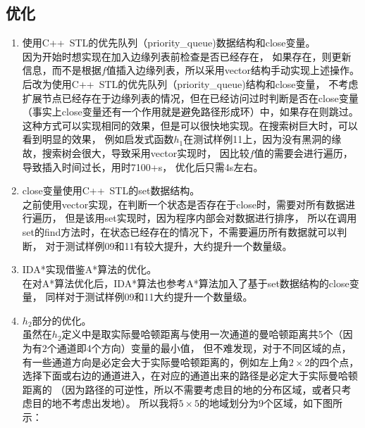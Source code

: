 \documentclass[UTF8]{article}
\begin{document}
    \subsection{优化}
    \begin{enumerate}[label=\roman*.]
        \item 使用C++\ STL的优先队列（{\jetbrains priority\_queue})数据结构和{\jetbrains close}变量。\\
        因为开始时想实现在加入边缘列表前检查是否已经存在，
        如果存在，则更新信息，而不是根据$f$值插入边缘列表，所以采用{\jetbrains vector}结构手动实现上述操作。
        后改为使用C++\ STL的优先队列（{\jetbrains priority\_queue})结构和{\jetbrains close}变量，
        不考虑扩展节点已经存在于边缘列表的情况，但在已经访问过时判断是否在{\jetbrains close}变量
        （事实上{\jetbrains close}变量还有一个作用就是避免路径形成环）中，如果存在则跳过。
        这种方式可以实现相同的效果，但是可以很快地实现。在搜索树巨大时，可以看到明显的效果，
        例如启发式函数$h_1$在测试样例11上，因为没有黑洞的缘故，搜索树会很大，导致采用{\jetbrains vector}实现时，
        因比较$f$值的需要会进行遍历，导致插入时间过长，用时7100+s，
        优化后只需4s左右。
        \item {\jetbrains close}变量使用C++\ STL的{\jetbrains set}数据结构。\\
        之前使用{\jetbrains vector}实现，在判断一个状态是否存在于{\jetbrains close}时，需要对所有数据进行遍历，
        但是该用{\jetbrains set}实现时，因为程序内部会对数据进行排序，
        所以在调用{\jetbrains set}的{\jetbrains find}方法时，在状态已经存在的情况下，不需要遍历所有数据就可以判断，
        对于测试样例09和11有较大提升，大约提升一个数量级。
        \item IDA*实现借鉴A*算法的优化。\\
        在对A*算法优化后，IDA*算法也参考A*算法加入了基于{\jetbrains set}数据结构的{\jetbrains close}变量，
        同样对于测试样例09和11大约提升一个数量级。
        \item $h_2$部分的优化。\\
        虽然在$h_2$定义中是取实际曼哈顿距离与使用一次通道的曼哈顿距离共5个（因为有2个通道即4个方向）变量的最小值，
        但不难发现，对于不同区域的点，有一些通道方向是必定会大于实际曼哈顿距离的，例如左上角$2\times 2$的四个点，
        选择下面或右边的通道进入，在对应的通道出来的路径是必定大于实际曼哈顿距离的
        （因为路径的可逆性，所以不需要考虑目的地的分布区域，或者只考虑目的地不考虑出发地）。
        所以我将$5\times 5$的地域划分为9个区域，如下图所示：
        \begin{figure}[H]

\end{figure}
\end{enumerate}
\end{document}
